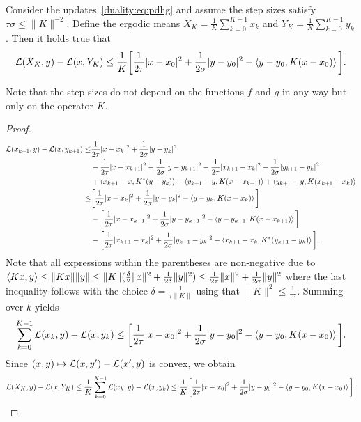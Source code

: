 \begin{theorem}
    Consider the updates~\eqref{duality:eq:pdhg} and assume the step sizes satisfy $\tau\sigma\leq \|K\|^{-2}$. Define the ergodic means $X_K = \frac{1}{K}\sum_{k=0}^{K-1}x_k$ and $Y_K = \frac{1}{K}\sum_{k=0}^{K-1}y_k$. Then it holds true that 
    \begin{equation}
        \mathcal{L}(X_{K},y) - \mathcal{L}(x,Y_{K})\leq \frac{1}{K}\bigg[\frac{1}{2\tau}|x-x_0|^2 + \frac{1}{2\sigma}|y-y_0|^2 - \left\langle y-y_0 , K(x-x_{0})\right\rangle\bigg].
    \end{equation}
\end{theorem}
\begin{rem}
    Note that the step sizes do not depend on the functions $f$ and $g$ in any way but only on the operator $K$.

\end{rem}
\begin{proof}
    \begin{equation}
        \begin{aligned}
            \mathcal{L}(x_{k+1},y) - \mathcal{L}(x,y_{k+1})
            \leq& \frac{1}{2\tau}|x-x_k|^2 + \frac{1}{2\sigma}|y-y_k|^2\\
            &-\frac{1}{2\tau}|x-x_{k+1}|^2 - \frac{1}{2\sigma}|y-y_{k+1}|^2
            -\frac{1}{2\tau}|x_{k+1}-x_k|^2 - \frac{1}{2\sigma}|y_{k+1}-y_k|^2\\
            &+\left\langle x_{k+1}-x , K^*(y-y_k)\right\rangle  - \left\langle y_{k+1}-y , K(x-x_{k+1})\right\rangle + \left\langle y_{k+1}-y , K(x_{k+1}-x_k)\right\rangle\\
            \leq& \bigg[\frac{1}{2\tau}|x-x_k|^2 + \frac{1}{2\sigma}|y-y_k|^2 - \left\langle y-y_k , K(x-x_{k})\right\rangle\bigg]\\
            &-\bigg[\frac{1}{2\tau}|x-x_{k+1}|^2 + \frac{1}{2\sigma}|y-y_{k+1}|^2 - \left\langle y-y_{k+1} , K(x-x_{k+1})\right\rangle\bigg]\\
            &-\bigg[ \frac{1}{2\tau}|x_{k+1}-x_k|^2 + \frac{1}{2\sigma}|y_{k+1}-y_k|^2 - \left\langle x_{k+1}-x_k , K^*(y_{k+1}-y_{k})\right\rangle\bigg].
        \end{aligned}
    \end{equation}
    Note that all expressions within the parentheses are non-negative due to $\left\langle Kx , y\right\rangle\leq \|Kx\|\|y\|\leq\|K\| (\frac{\delta}{2}\|x\|^2 + \frac{1}{2\delta}\|y\|^2)\leq \frac{1}{2\tau}\|x\|^2 + \frac{1}{2\sigma}\|y\|^2$
    where the last inequality follows with the choice $\delta = \frac{1}{\tau\|K\|}$ using that $\|K\|^2\leq \frac{1}{\tau\sigma}$.
    Summing over $k$ yields
    \begin{equation}
        \sum_{k=0}^{K-1} \mathcal{L}(x_{k},y) - \mathcal{L}(x,y_{k}) \leq \bigg[\frac{1}{2\tau}|x-x_0|^2 + \frac{1}{2\sigma}|y-y_0|^2 - \left\langle y-y_0 , K(x-x_{0})\right\rangle\bigg].
    \end{equation}
    Since $(x,y)\mapsto \mathcal{L}(x,y') - \mathcal{L}(x',y)$ is convex, we obtain
    \begin{equation}
        \mathcal{L}(X_{K},y) - \mathcal{L}(x,Y_{K})\leq \frac{1}{K}\sum_{k=0}^{K-1} \mathcal{L}(x_{k},y) - \mathcal{L}(x,y_{k}) \leq \frac{1}{K}\bigg[\frac{1}{2\tau}|x-x_0|^2 + \frac{1}{2\sigma}|y-y_0|^2 - \left\langle y-y_0 , K(x-x_{0})\right\rangle\bigg].
    \end{equation}
\end{proof}



